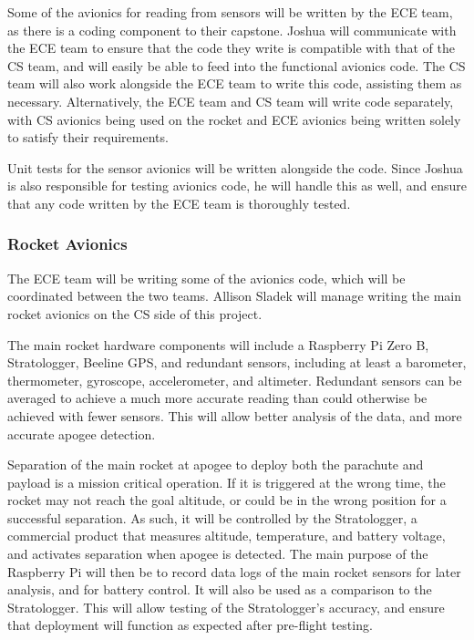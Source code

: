 \documentclass[onecolumn, draftclsnofoot, 10pt, compsoc]{IEEEtran}
\begin{document}
Some of the avionics for reading from sensors will be written by the ECE team, as there is a coding component to their capstone. Joshua will communicate with the ECE team to ensure that the code they write is compatible with that of the CS team, and will easily be able to feed into the functional avionics code. The CS team will also work alongside the ECE team to write this code, assisting them as necessary. Alternatively, the ECE team and CS team will write code separately, with CS avionics being used on the rocket and ECE avionics being written solely to satisfy their requirements.  

Unit tests for the sensor avionics will be written alongside the code. Since Joshua is also responsible for testing avionics code, he will handle this as well, and ensure that any code written by the ECE team is thoroughly tested.

\subsubsection{Rocket Avionics}

The ECE team will be writing some of the avionics code, which will be coordinated between the two teams. 
Allison Sladek will manage writing the main rocket avionics on the CS side of this project. 

The main rocket hardware components will include a Raspberry Pi Zero B, Stratologger, Beeline GPS, and redundant sensors, including at least a barometer, thermometer, gyroscope, accelerometer,  and altimeter.
Redundant sensors can be averaged to achieve a much more accurate reading than could otherwise be achieved with fewer sensors. 
This will allow better analysis of the data, and more accurate apogee detection.

Separation of the main rocket at apogee to deploy both the parachute and payload is a mission critical operation. 
If it is triggered at the wrong time, the rocket may not reach the goal altitude, or could be in the wrong position for a successful separation. 
As such, it will be controlled by the Stratologger, a commercial product that measures altitude, temperature, and battery voltage, and activates separation when apogee is detected. 
The main purpose of the Raspberry Pi will then be to record data logs of the main rocket sensors for later analysis, and for battery control. 
It will also be used as a comparison to the Stratologger. 
This will allow testing of the Stratologger’s accuracy, and ensure that deployment will function as expected after pre-flight testing. 
\end{document}

